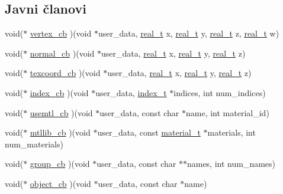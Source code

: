 \subsection*{Javni članovi}
\begin{DoxyCompactItemize}
\item 
void($\ast$ \hyperlink{structtinyobj_1_1callback__t___a7029c16962a3edb4b036330f02f91816}{vertex\+\_\+cb} )(void $\ast$user\+\_\+data, \hyperlink{namespacetinyobj_ad5ca7469ff56bf0d8423120cfd99adce}{real\+\_\+t} x, \hyperlink{namespacetinyobj_ad5ca7469ff56bf0d8423120cfd99adce}{real\+\_\+t} y, \hyperlink{namespacetinyobj_ad5ca7469ff56bf0d8423120cfd99adce}{real\+\_\+t} z, \hyperlink{namespacetinyobj_ad5ca7469ff56bf0d8423120cfd99adce}{real\+\_\+t} w)
\item 
void($\ast$ \hyperlink{structtinyobj_1_1callback__t___a0edd10bf4b39720520c8cfa24476ffe1}{normal\+\_\+cb} )(void $\ast$user\+\_\+data, \hyperlink{namespacetinyobj_ad5ca7469ff56bf0d8423120cfd99adce}{real\+\_\+t} x, \hyperlink{namespacetinyobj_ad5ca7469ff56bf0d8423120cfd99adce}{real\+\_\+t} y, \hyperlink{namespacetinyobj_ad5ca7469ff56bf0d8423120cfd99adce}{real\+\_\+t} z)
\item 
void($\ast$ \hyperlink{structtinyobj_1_1callback__t___ac447bcedbbe734887d796b32604665e8}{texcoord\+\_\+cb} )(void $\ast$user\+\_\+data, \hyperlink{namespacetinyobj_ad5ca7469ff56bf0d8423120cfd99adce}{real\+\_\+t} x, \hyperlink{namespacetinyobj_ad5ca7469ff56bf0d8423120cfd99adce}{real\+\_\+t} y, \hyperlink{namespacetinyobj_ad5ca7469ff56bf0d8423120cfd99adce}{real\+\_\+t} z)
\item 
void($\ast$ \hyperlink{structtinyobj_1_1callback__t___a40a2a07b3c61aedb38a1efd3c2e53a76}{index\+\_\+cb} )(void $\ast$user\+\_\+data, \hyperlink{structtinyobj_1_1index__t}{index\+\_\+t} $\ast$indices, int num\+\_\+indices)
\item 
void($\ast$ \hyperlink{structtinyobj_1_1callback__t___a8c5ae85ae10186b6c0e925b4b2b9a987}{usemtl\+\_\+cb} )(void $\ast$user\+\_\+data, const char $\ast$name, int material\+\_\+id)
\item 
void($\ast$ \hyperlink{structtinyobj_1_1callback__t___ac9002031da7d0ae5e035e6ccfbb5fb0e}{mtllib\+\_\+cb} )(void $\ast$user\+\_\+data, const \hyperlink{structtinyobj_1_1material__t}{material\+\_\+t} $\ast$materials, int num\+\_\+materials)
\item 
void($\ast$ \hyperlink{structtinyobj_1_1callback__t___a2d8b46a38a919dbd19defe2cb5a45cb1}{group\+\_\+cb} )(void $\ast$user\+\_\+data, const char $\ast$$\ast$names, int num\+\_\+names)
\item 
void($\ast$ \hyperlink{structtinyobj_1_1callback__t___ad91a780d704c9d7ed9f858f42f33c78d}{object\+\_\+cb} )(void $\ast$user\+\_\+data, const char $\ast$name)
\end{DoxyCompactItemize}


